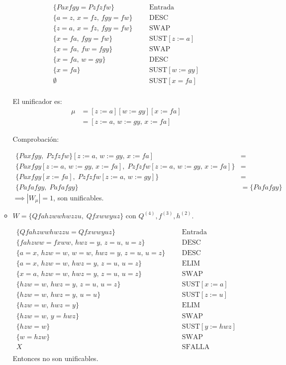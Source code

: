 \documentclass[11pt,letterpaper]{article}
\begin{document}
\begin{enumerate}
\begin{itemize}
    \begin{align*}
      \{Paxfgy = Pzfzfw\}& & &\text{Entrada}\\
      \{a = z,\, x=fz,\, fgy = fw\}& & &\text{DESC}\\
      \{z = a,\, x=fz,\, fgy = fw\}& & &\text{SWAP}\\
      \{x=fa,\, fgy = fw\}& & &\text{SUST}[z:=a]\\
      \{x=fa,\, fw = fgy\}& & &\text{SWAP}\\
      \{x=fa,\, w = gy\}& & &\text{DESC}\\
      \{x=fa\}& & &\text{SUST}[w:=gy]\\
      \emptyset& & &\text{SUST}[x=fa]\\
    \end{align*}

    El unificador es:
    \begin{align*}
      \mu &= [z:=a][w:=gy][x:=fa]\\
      &= [z:=a,\,w:=gy,\,x:=fa]
    \end{align*}

    Comprobación:

    \begin{align*}
      \{Paxfgy,\; Pzfzfw\}[z:=a,\,w:=gy,\,x:=fa] &= \\
      \{Paxfgy[z:=a,\,w:=gy,\,x:=fa] ,\; Pzfzfw[z:=a,\,w:=gy,\,x:=fa]\} &=\\
      \{Paxfgy[x:=fa] ,\; Pzfzfw[z:=a,\,w:=gy]\} &=\\
      \{Pafafgy ,\; Pafafgy\} &= \{Pafafgy\}
    \end{align*}
    $\implies |W_\mu| = 1$, son unificables.
    \newpage
  \item $W=\{Qfahzwwhwzzu,\;Qfxwwyuz\}$ con $Q^{(4)},f^{(3)}, h^{(2)}$.

    \begin{align*}
      \{Qfahzwwhwzzu = Qfxwwyuz\}& & &\text{Entrada}\\
      \{fahzww = fxww,\, hwz = y,\, z = u,\, u=z\}& & &\text{DESC}\\
      \{a = x,\, hzw = w,\, w = w,\, hwz = y,\, z = u,\, u=z\}& & &\text{DESC}\\
      \{a = x,\, hzw = w,\, hwz = y,\, z = u,\, u=z\}& & &\text{ELIM}\\
      \{x = a,\, hzw = w,\, hwz = y,\, z = u,\, u=z\}& & &\text{SWAP}\\
      \{hzw = w,\, hwz = y,\, z = u,\, u=z\}& & &\text{SUST}[x:=a]\\
      \{hzw = w,\, hwz = y,\,u=u\}& & &\text{SUST}[z:=u]\\
      \{hzw = w,\, hwz = y\}& & &\text{ELIM}\\
      \{hzw = w,\, y = hwz\}& & &\text{SWAP}\\
      \{hzw = w\}& & &\text{SUST}[y:=hwz]\\
      \{w=hzw\}& & &\text{SWAP}\\
      X& & &\text{SFALLA}\\
    \end{align*}
    Entonces no son unificables.
  \end{itemize} 


\end{enumerate}
\end{document}
